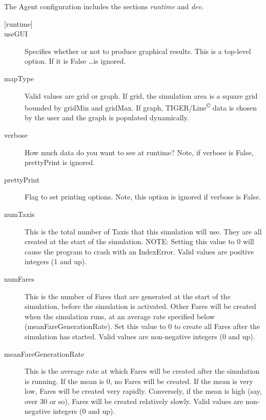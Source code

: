 \documentclass[11pt,letterpaper,onecolumn,twoside,openright,final]{report}
\begin{document}
The Agent configuration includes the sections \emph{runtime} and \emph{dev}.
\begin{description}
\item[{[runtime]}]

\item[useGUI]Specifies whether or not to produce graphical results.
This is a top-level option.
If it is False \ldots is ignored.

\item[mapType]Valid values are grid or graph.
If grid, the simulation area is a square grid bounded by gridMin and gridMax.
If graph, TIGER/Line\textsuperscript{\tiny{\copyright}} data is chosen by the user and the graph is populated dynamically.

\item[verbose] How much data do you want to see at runtime?
Note, if verbose is False, prettyPrint is ignored.

\item[prettyPrint]Flag to set printing options.
Note, this option is ignored if verbose is False.

\item[numTaxis]This is the total number of Taxis that this simulation will use.
They are all created at the start of the simulation.
NOTE: Setting this value to 0 will cause the program to crash with an IndexError.
Valid values are positive integers (1 and up).

\item[numFares]This is the number of Fares that are generated at the start of the simulation, before the simulation is activated.
Other Fares will be created when the simulation runs, at an average rate specified below (meanFareGenerationRate).
Set this value to 0 to create all Fares after the simulation has started.
Valid values are non-negative integers (0 and up).

\item[meanFareGenerationRate]This is the average rate at which Fares will be created after the simulation is running.
If the mean is 0, no Fares will be created.
If the mean is very low, Fares will be created very rapidly.
Conversely, if the mean is high (say, over 30 or so), Fares will be created relatively slowly.
Valid values are non-negative integers (0 and up).


\end{description}
\end{document}
